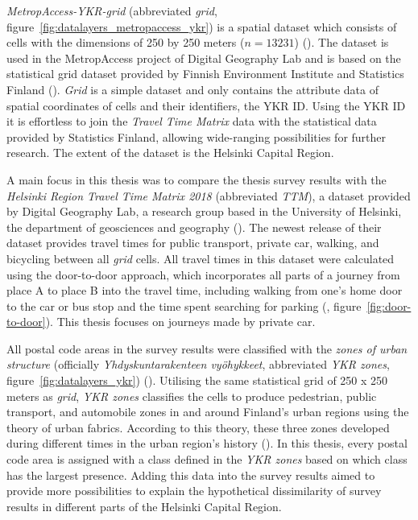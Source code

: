 \textit{MetropAccess-YKR-grid} (abbreviated \textit{grid}, figure~\ref{fig:datalayers_metropaccess_ykr}) is a spatial dataset which consists of cells with the dimensions of 250 by 250 meters ($n=13231$) (\cite{Toivonen2014a}). The dataset is used in the MetropAccess project of Digital Geography Lab and is based on the statistical grid dataset provided by Finnish Environment Institute and Statistics Finland (\cite{StatisticsFinland2020}). \textit{Grid} is a simple dataset and only contains the attribute data of spatial coordinates of cells and their identifiers, the YKR ID. Using the YKR ID it is effortless to join the \textit{Travel Time Matrix} data with the statistical data provided by Statistics Finland, allowing wide-ranging possibilities for further research. The extent of the dataset is the Helsinki Capital Region.

A main focus in this thesis was to compare the thesis survey results with the \textit{Helsinki Region Travel Time Matrix 2018} (abbreviated \textit{TTM}), a dataset provided by Digital Geography Lab, a research group based in the University of Helsinki, the department of geosciences and geography (\cite{Tenkanen2018}). The newest release of their dataset provides travel times for public transport, private car, walking, and bicycling between all \textit{grid} cells. All travel times in this dataset were calculated using the door-to-door approach, which incorporates all parts of a journey from place A to place B into the travel time, including walking from one's home door to the car or bus stop and the time spent searching for parking (\cite{Salonen2013}, figure~\ref{fig:door-to-door}). This thesis focuses on journeys made by private car.

All postal code areas in the survey results were classified with the \textit{zones of urban structure} (officially \textit{Yhdyskuntarakenteen vyöhykkeet}, abbreviated \textit{YKR zones}, figure~\ref{fig:datalayers_ykr}) (\cite{Ristimaki2017}). Utilising the same statistical grid of 250 x 250 meters as \textit{grid}, \textit{YKR zones} classifies the cells to produce pedestrian, public transport, and automobile zones in and around Finland's urban regions using the theory of urban fabrics. According to this theory, these three zones developed during different times in the urban region's history (\cite{Newman2016}). In this thesis, every postal code area is assigned with a class defined in the \textit{YKR zones} based on which class has the largest presence. Adding this data into the survey results aimed to provide more possibilities to explain the hypothetical dissimilarity of survey results in different parts of the Helsinki Capital Region.

